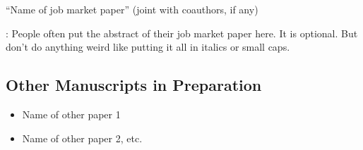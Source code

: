 \documentclass[12pt]{safecv}%
\begin{document}
``Name of job market paper'' (joint with coauthors, if any)

\vspace{\itemsep}

: People often put the abstract of their job market
paper here. It is optional. But don't do anything weird like putting
it all in italics or small caps.
  
\subsection*{Other Manuscripts in Preparation}
\begin{itemize}
\item Name of other paper 1
\item Name of other paper 2, etc.
\end{itemize}

\end{document}
